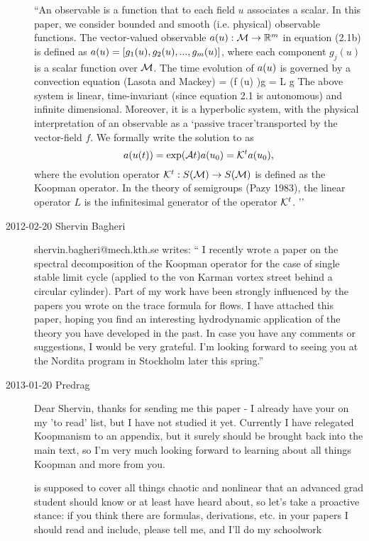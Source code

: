 \begin{description}
``An observable is a function that to each field $u$ associates a scalar.
In this paper, we consider bounded and smooth (i.e. physical) observable
functions. The vector-valued observable $a(u) : {\cal M} \to \mathbb{R}^m$ in
equation (2.1b) is defined as $a(u) = [g_1(u), g_2(u), . . . , g_m(u)]$,
where each component $g_j(u)$ is a scalar function over ${\cal M}$. The time
evolution of $a(u)$ is governed by a convection equation (Lasota and
Mackey)
\beq
{}
= (f (u) \cdot \nabla)g = L g
The above system is linear, time-invariant (since equation 2.1 is
autonomous) and infinite dimensional. Moreover, it is a hyperbolic
system, with the physical interpretation of an observable as a `passive
tracer'transported by the vector-field $f$. We formally write the
solution to  as
\[
\obser(u(t)) = \exp(\Aop t)\obser(u_0) = \Uop^t \obser(u_0),
\]
where the evolution operator ${\cal K}^t : S({\cal M}) \to S({\cal M})$ is defined as the
Koopman operator. In the theory of semigroups (Pazy 1983),
the linear operator $L$ is the infinitesimal generator of the operator
${\cal K}^t$.
''
\item[2012-02-20  Shervin Bagheri]
shervin.bagheri@mech.kth.se writes: `` I recently wrote a paper on
the spectral decomposition of the Koopman operator for the case of
single stable limit cycle (applied to the von Karman vortex street
behind a circular cylinder). Part of my work have been strongly
influenced by the papers you wrote on the trace formula for flows.  I
have attached this paper, hoping you find an interesting hydrodynamic
application of the theory you have developed in the past.  In case
you have any comments or suggestions, I would be very grateful. I'm
looking forward to seeing you at the Nordita program in Stockholm
later this spring.''

\item[2013-01-20 Predrag] Dear Shervin, thanks for sending me this paper
- I already have your  on my 'to read' list,
but I have not studied it yet. Currently I have relegated Koopmanism
to an appendix, but it surely should be brought back into the main
text, so I'm very much looking forward to learning about all things
Koopman and more from you.

\wwwcb{} is supposed to cover all things chaotic and nonlinear that
an advanced grad student should know or at least have heard about, so
let's take a proactive stance: if you think there are formulas,
derivations, etc. in your papers I should read and include, please
tell me, and I'll do my schoolwork


\end{description}
